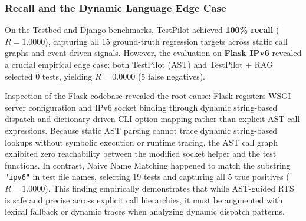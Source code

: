 \documentclass[12pt,onecolumn,draftclsnofoot]{IEEEtran}
\begin{document}
\subsubsection{Recall and the Dynamic Language Edge Case}
On the Testbed and Django benchmarks, TestPilot achieved \textbf{100\% recall} ($R = 1.0000$), capturing all 15 ground-truth regression targets across static call graphs and event-driven signals. However, the evaluation on \textbf{Flask IPv6} revealed a crucial empirical edge case: both TestPilot (AST) and TestPilot + RAG selected 0 tests, yielding $R = 0.0000$ (5 false negatives). 

Inspection of the Flask codebase revealed the root cause: Flask registers WSGI server configuration and IPv6 socket binding through dynamic string-based dispatch and dictionary-driven CLI option mapping rather than explicit AST call expressions. Because static AST parsing cannot trace dynamic string-based lookups without symbolic execution or runtime tracing, the AST call graph exhibited zero reachability between the modified socket helper and the test functions. In contrast, Naive Name Matching happened to match the substring \texttt{"ipv6"} in test file names, selecting 19 tests and capturing all 5 true positives ($R = 1.0000$). This finding empirically demonstrates that while AST-guided RTS is safe and precise across explicit call hierarchies, it must be augmented with lexical fallback or dynamic traces when analyzing dynamic dispatch patterns.
\end{document}

